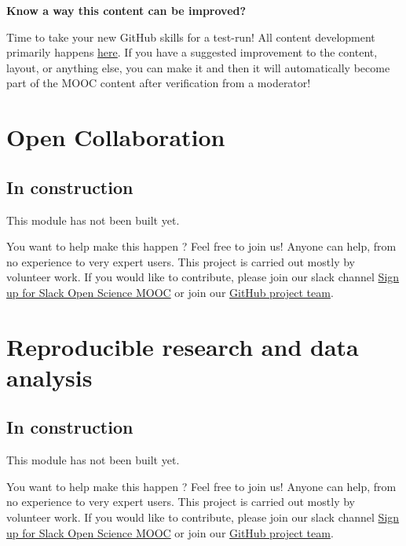 \documentclass[]{book}
\begin{document}
\textbf{Know a way this content can be improved?}

Time to take your new GitHub skills for a test-run! All content development primarily happens \href{https://github.com/OpenScienceMOOC/Module-1-Open-Principles/blob/master/content_development/MAIN.md}{here}. If you have a suggested improvement to the content, layout, or anything else, you can make it and then it will automatically become part of the MOOC content after verification from a moderator!

\hypertarget{module2}{%
\chapter{Open Collaboration}\label{module2}}

\hypertarget{in-construction}{%
\section{In construction}\label{in-construction}}

This module has not been built yet.

You want to help make this happen ? Feel free to join us! Anyone can help, from no experience to very expert users. This project is carried out mostly by volunteer work. If you would like to contribute, please join our slack channel \href{https://osmooc.herokuapp.com/}{Sign up for Slack Open Science MOOC} or join our \href{https://open-science-mooc-invite.herokuapp.com/}{GitHub project team}.

\hypertarget{module3}{%
\chapter{Reproducible research and data analysis}\label{module3}}

\hypertarget{in-construction-1}{%
\section{In construction}\label{in-construction-1}}

This module has not been built yet.

You want to help make this happen ? Feel free to join us! Anyone can help, from no experience to very expert users. This project is carried out mostly by volunteer work. If you would like to contribute, please join our slack channel \href{https://osmooc.herokuapp.com/}{Sign up for Slack Open Science MOOC} or join our \href{https://open-science-mooc-invite.herokuapp.com/}{GitHub project team}.
\end{document}
